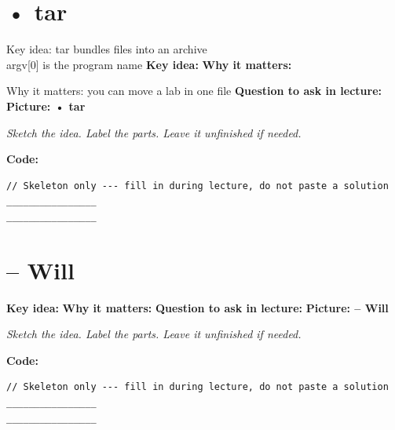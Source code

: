\documentclass[12pt]{article}
\newcommand{\deflabel}[1]{\noindent\textcolor{slotdef}{\textbf{#1}}}
\newcommand{\drawlabel}[1]{\noindent\textcolor{slotdraw}{\textbf{#1}}}
\begin{document}
\section{• tar}
\par\vspace{0.35em}
{\color{studentink}
Key idea: tar bundles files into an archive \\ 
argv[0] is the program name
}
\vspace{0.55em}
\Needspace{0.16\textheight}
\deflabel{Key idea:}
\vspace{1.1em}
\Needspace{0.16\textheight}
\deflabel{Why it matters:}
\par\vspace{0.35em}
{\color{studentink}
Why it matters: you can move a lab in one file
}
\vspace{0.55em}
\vspace{1.1em}
\Needspace{0.16\textheight}
\deflabel{Question to ask in lecture:}
\vspace{1.1em}
\Needspace{0.28\textheight}
\drawlabel{Picture: • tar}
{\color{slotdraw}
\begin{framed}
\color{ink}
\begin{minipage}[t][0.22\textheight]{\textwidth}
\vspace{0.4em}
\textit{Sketch the idea. Label the parts. Leave it unfinished if needed.}
\end{minipage}
\end{framed}
}
\vspace{1em}
\Needspace{0.18\textheight}
\drawlabel{Code:}
\begin{lstlisting}
// Skeleton only --- fill in during lecture, do not paste a solution
________________
________________
\end{lstlisting}
\vspace{1em}
\section{– Will}
\Needspace{0.16\textheight}
\deflabel{Key idea:}
\vspace{1.1em}
\Needspace{0.16\textheight}
\deflabel{Why it matters:}
\vspace{1.1em}
\Needspace{0.16\textheight}
\deflabel{Question to ask in lecture:}
\vspace{1.1em}
\Needspace{0.28\textheight}
\drawlabel{Picture: – Will}
{\color{slotdraw}
\begin{framed}
\color{ink}
\begin{minipage}[t][0.22\textheight]{\textwidth}
\vspace{0.4em}
\textit{Sketch the idea. Label the parts. Leave it unfinished if needed.}
\end{minipage}
\end{framed}
}
\vspace{1em}
\Needspace{0.18\textheight}
\drawlabel{Code:}
\begin{lstlisting}
// Skeleton only --- fill in during lecture, do not paste a solution
________________
________________
\end{lstlisting}
\vspace{1em}
\end{document}
